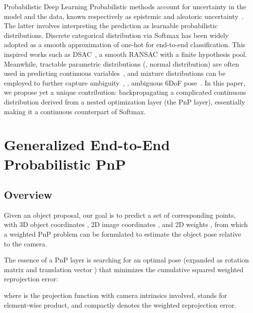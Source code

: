 \documentclass[10pt,twocolumn,letterpaper]{article}
\makeatletter
\renewcommand{\paragraph}{
  \@startsection{paragraph}{4}
  {\z@}{1.0ex \@plus 0ex \@minus .3ex}{-1em}
  {\normalfont\normalsize\bfseries}
}
\makeatother
\begin{document}
\paragraph{Probabilistic Deep Learning}
Probabilistic methods account for uncertainty in the model and the data, known respectively as epistemic and aleatoric uncertainty~\cite{kendall2017uncertainties}. The latter involves interpreting the prediction as learnable probabilistic distributions. Discrete categorical distribution via Softmax has been widely adopted as a smooth approximation of one-hot  for end-to-end classification. This inspired works such as DSAC~\cite{dsac}, a smooth RANSAC with a finite hypothesis pool. Meanwhile, tractable parametric distributions (\eg, normal distribution) are often used in predicting continuous variables~\cite{klloss, wu2020unsupervised, kendall2017uncertainties, VAE, Gilitschenski2020, monorun}, and mixture distributions can be employed to further capture ambiguity~\cite{makansi2019, Bishop94mixturedensity, Brachmann_2016_CVPR}, \eg, ambiguous 6DoF pose~\cite{bui20206d}. In this paper, we propose yet a unique contribution: backpropagating a complicated continuous distribution derived from a nested optimization layer (the PnP layer), essentially making it a continuous counterpart of Softmax.


\section{Generalized End-to-End Probabilistic PnP}

\subsection{Overview} \label{overview}

Given an object proposal,
our goal is to predict a set  of  corresponding points, with 3D object coordinates , 2D image coordinates , and 2D weights , from which a weighted PnP problem can be formulated to estimate the object pose relative to the camera.

The essence of a PnP layer is searching for an optimal pose  (expanded as rotation matrix  and translation vector ) that minimizes the cumulative squared weighted reprojection error:
\vspace{-1ex}

where  is the projection function with camera intrinsics involved,  stands for element-wise product, and  compactly denotes the weighted reprojection error.
\end{document}
